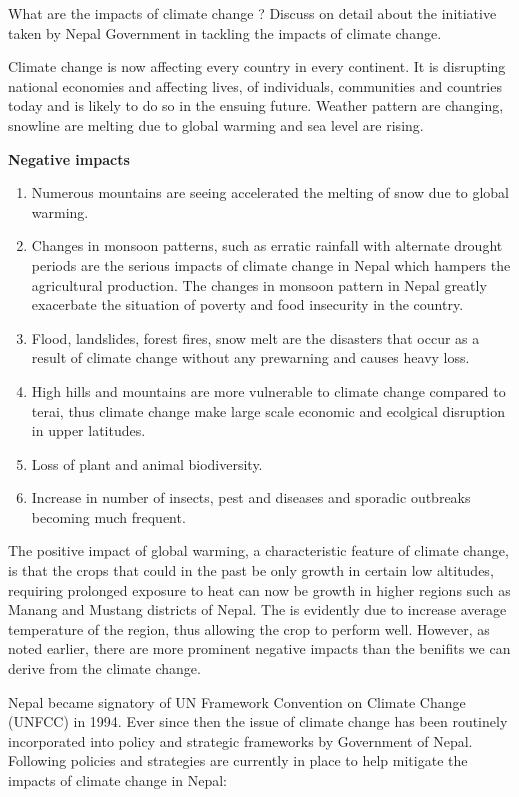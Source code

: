 \documentclass[
]{book}
\providecommand{\tightlist}{%
  \setlength{\itemsep}{0pt}\setlength{\parskip}{0pt}}
\begin{document}
What are the impacts of climate change ? Discuss on detail about the initiative taken by Nepal Government in tackling the impacts of climate change.

Climate change is now affecting every country in every continent. It is disrupting national economies and affecting lives, of individuals, communities and countries today and is likely to do so in the ensuing future. Weather pattern are changing, snowline are melting due to global warming and sea level are rising.

\textbf{Negative impacts}

\begin{enumerate}
\def\labelenumi{\arabic{enumi}.}
\tightlist
\item
  Numerous mountains are seeing accelerated the melting of snow due to global warming.
\item
  Changes in monsoon patterns, such as erratic rainfall with alternate drought periods are the serious impacts of climate change in Nepal which hampers the agricultural production. The changes in monsoon pattern in Nepal greatly exacerbate the situation of poverty and food insecurity in the country.
\item
  Flood, landslides, forest fires, snow melt are the disasters that occur as a result of climate change without any prewarning and causes heavy loss.
\item
  High hills and mountains are more vulnerable to climate change compared to terai, thus climate change make large scale economic and ecolgical disruption in upper latitudes.
\item
  Loss of plant and animal biodiversity.
\item
  Increase in number of insects, pest and diseases and sporadic outbreaks becoming much frequent.
\end{enumerate}

The positive impact of global warming, a characteristic feature of climate change, is that the crops that could in the past be only growth in certain low altitudes, requiring prolonged exposure to heat can now be growth in higher regions such as Manang and Mustang districts of Nepal. The is evidently due to increase average temperature of the region, thus allowing the crop to perform well. However, as noted earlier, there are more prominent negative impacts than the benifits we can derive from the climate change.

Nepal became signatory of UN Framework Convention on Climate Change (UNFCC) in 1994. Ever since then the issue of climate change has been routinely incorporated into policy and strategic frameworks by Government of Nepal. Following policies and strategies are currently in place to help mitigate the impacts of climate change in Nepal:
\end{document}
